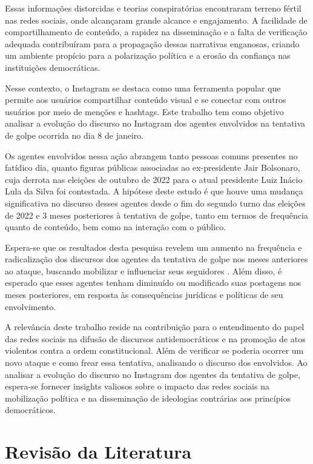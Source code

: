 \documentclass[manuscript,screen,review]{acmart}
\begin{document}
Essas informações distorcidas e teorias conspiratórias encontraram terreno fértil nas redes sociais, onde alcançaram grande alcance e engajamento. A facilidade de compartilhamento de conteúdo, a rapidez na disseminação e a falta de verificação adequada contribuíram para a propagação dessas narrativas enganosas, criando um ambiente propício para a polarização política e a erosão da confiança nas instituições democráticas.

Nesse contexto, o Instagram se destaca como uma ferramenta popular que permite aos usuários compartilhar conteúdo visual e se conectar com outros usuários por meio de menções e hashtags. Este trabalho tem como objetivo analisar a evolução do discurso no Instagram dos agentes envolvidos na tentativa de golpe ocorrida no dia 8 de janeiro.

Os agentes envolvidos nessa ação abrangem tanto pessoas comuns presentes no fatídico dia, quanto figuras públicas associadas ao ex-presidente Jair Bolsonaro, cuja derrota nas eleições de outubro de 2022 para o atual presidente Luiz Inácio Lula da Silva foi contestada. A hipótese deste estudo é que houve uma mudança significativa no discurso desses agentes desde o fim do segundo turno das eleições de 2022 e 3 meses posteriores à tentativa de golpe, tanto em termos de frequência quanto de conteúdo, bem como na interação com o público.

Espera-se que os resultados desta pesquisa revelem um aumento na frequência e radicalização dos discursos dos agentes da tentativa de golpe nos meses anteriores ao ataque, buscando mobilizar e influenciar seus seguidores \cite{castells2015}. Além disso, é esperado que esses agentes tenham diminuído ou modificado suas postagens nos meses posteriores, em resposta às consequências jurídicas e políticas de seu envolvimento.

A relevância deste trabalho reside na contribuição para o entendimento do papel das redes sociais na difusão de discursos antidemocráticos e na promoção de atos violentos contra a ordem constitucional. Além de verificar se poderia ocorrer um novo ataque e como frear essa tentativa, analisando o discurso dos envolvidos. Ao analisar a evolução do discurso no Instagram dos agentes da tentativa de golpe, espera-se fornecer insights valiosos sobre o impacto das redes sociais na mobilização política e na disseminação de ideologias contrárias aos princípios democráticos.

\section{Revisão da Literatura}
\end{document}
